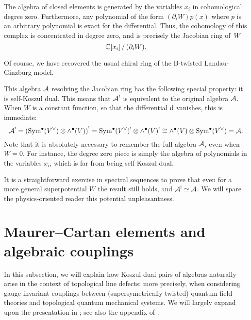 \documentclass[11pt]{amsart}
\begin{document}
The algebra of closed elements is generated by the variables $x_i$ in cohomological degree zero. 
Furthermore, any polynomial of the form $(\partial_i W) p(x)$ where $p$ is an arbitrary polynomial is exact for the differential. 
Thus, the cohomology of this complex is concentrated in degree zero, and is precisely the Jacobian ring of~$W$
\[
\mathbb C[x_i] \, / \, (\partial_i W) .
\]

Of course, we have recovered the usual chiral ring of the B-twisted Landau-Ginzburg model. 

This algebra $\mathcal A$ resolving the Jacobian ring has the following special property: it is self-Koszul dual. 
This means that $\mathcal A^!$ is equivalent to the original algebra $\mathcal A$. 
When $W$ is a constant function, so that the differential ${\rm d}$ vanishes, this is immediate:
\[
\mathcal A^! = \left(\operatorname{Sym}^\bullet (V^\vee) \otimes \wedge^\bullet(V)\right)^! = \operatorname{Sym}^\bullet (V^\vee)^! \otimes \wedge^\bullet(V)^! \cong \wedge^\bullet (V) \otimes \operatorname{Sym}^\bullet (V^\vee) = \mathcal A .
\]
Note that it is absolutely necessary to remember the full algebra $\mathcal A$, even when $W = 0$. 
For instance, the degree zero piece is simply the algebra of polynomials in the variables $x_i$, which is far from being self Koszul dual.

It is a straightforward exercise in spectral sequences to prove that even for a more general superpotential $W$ the result still holds, and $\mathcal A^! \simeq \mathcal A$. We will spare the physics-oriented reader this potential unpleasantness. 




\section{Maurer--Cartan elements and algebraic couplings}
\label{s:algcouple}

In this subsection, we will explain how Koszul dual pairs of algebras naturally arise in the context of topological line defects: more precisely, when considering gauge-invariant couplings between (supersymetrically twisted) quantum field theories and topological quantum mechanical systems. We will largely expand upon the presentation in \cite{CP}; see also the appendix of \cite{GO}.
\end{document}
